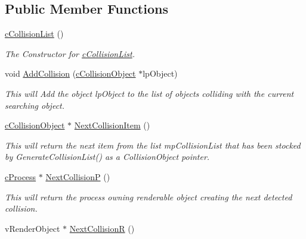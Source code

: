 \subsection*{Public Member Functions}
\begin{DoxyCompactItemize}
\item 
\hypertarget{classc_collision_list_a1b84b682ec105262682532b0a90754c2}{
\hyperlink{classc_collision_list_a1b84b682ec105262682532b0a90754c2}{cCollisionList} ()}
\label{classc_collision_list_a1b84b682ec105262682532b0a90754c2}

\begin{DoxyCompactList}\small\item\em The Constructor for \hyperlink{classc_collision_list}{cCollisionList}. \end{DoxyCompactList}\item 
\hypertarget{classc_collision_list_ace525d10fc1a38477cee11e14714b476}{
void \hyperlink{classc_collision_list_ace525d10fc1a38477cee11e14714b476}{AddCollision} (\hyperlink{classc_collision_object}{cCollisionObject} $\ast$lpObject)}
\label{classc_collision_list_ace525d10fc1a38477cee11e14714b476}

\begin{DoxyCompactList}\small\item\em This will Add the object lpObject to the list of objects colliding with the current searching object. \end{DoxyCompactList}\item 
\hypertarget{classc_collision_list_adeef80e9e181e81dc073ebcfa1d8bec4}{
\hyperlink{classc_collision_object}{cCollisionObject} $\ast$ \hyperlink{classc_collision_list_adeef80e9e181e81dc073ebcfa1d8bec4}{NextCollisionItem} ()}
\label{classc_collision_list_adeef80e9e181e81dc073ebcfa1d8bec4}

\begin{DoxyCompactList}\small\item\em This will return the next item from the list mpCollisionList that has been stocked by GenerateCollisionList() as a CollisionObject pointer. \end{DoxyCompactList}\item 
\hypertarget{classc_collision_list_ac641346bbc7e3d3b84880ae03b0496c5}{
\hyperlink{classc_process}{cProcess} $\ast$ \hyperlink{classc_collision_list_ac641346bbc7e3d3b84880ae03b0496c5}{NextCollisionP} ()}
\label{classc_collision_list_ac641346bbc7e3d3b84880ae03b0496c5}

\begin{DoxyCompactList}\small\item\em This will return the process owning renderable object creating the next detected collision. \end{DoxyCompactList}\item 
\hypertarget{classc_collision_list_a87c8ee3baa85ff002030c83bd1784192}{
vRenderObject $\ast$ \hyperlink{classc_collision_list_a87c8ee3baa85ff002030c83bd1784192}{NextCollisionR} ()}
\label{classc_collision_list_a87c8ee3baa85ff002030c83bd1784192}


\end{DoxyCompactItemize}
